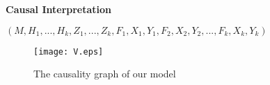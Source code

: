 \documentclass[landscape,dvips,a4]{seminar}
\begin{document}
\begin{slide}
  \begin{center}
    \textbf{\Large Causal Interpretation}
  \end{center}
 \vspace{3mm}
$(M,H_1,...,H_k,Z_1,...,Z_k,F_1,X_1,Y_1,F_2,X_2,Y_2,...,F_k,X_k,Y_k)$
\begin{figure*}[t]
  \centering





  \texttt{[image: V.eps]}
  \caption{The causality graph of our model}
  \label{fig:fig2}
\end{figure*}
\end{slide}
\end{document}
